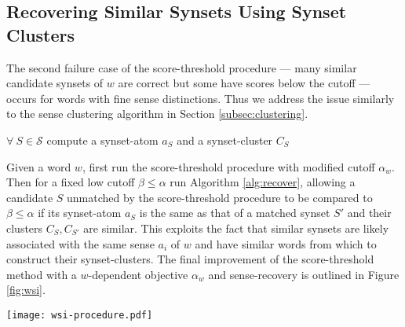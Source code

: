 \documentclass{book}
\begin{document}
\subsection{Recovering Similar Synsets Using Synset Clusters}
\label{subsec:recover}

The second failure case of the score-threshold procedure --- many similar candidate synsets of $w$ are correct but some have scores below the cutoff --- occurs for words with fine sense distinctions.
Thus we address the issue similarly to the sense clustering algorithm in Section \ref{subsec:clustering}.

\begin{algorithm}[H]
\label{alg:recover}
\SetAlgoLined
\SetAlgoNoEnd
{}
$\forall~S\in\mathcal{S}$ compute a synset-atom $a_S$ and a synset-cluster $C_S$\\
\caption{Synset Recovery}
\end{algorithm}

Given a word $w$, first run the score-threshold procedure with modified cutoff $\alpha_w$.
Then for a fixed low cutoff $\beta\le\alpha$ run Algorithm \ref{alg:recover}, allowing a candidate $S$ unmatched by the score-threshold procedure to be compared to $\beta\le\alpha$ if its synset-atom $a_S$ is the same as that of a matched synset $S'$ and their clusters $C_S,C_{S'}$ are similar.
This exploits the fact that similar synsets are likely associated with the same sense $a_i$ of $w$ and have similar words from which to construct their synset-clusters.
The final improvement of the score-threshold method with a $w$-dependent objective $\alpha_w$ and sense-recovery is outlined in Figure \ref{fig:wsi}.

\begin{figure*}[ht!]
\centering
\texttt{[image: wsi-procedure.pdf]}
\caption{
Score-threshold and sense-recovery procedures for French word $w=$ {\em dalle} (flagstone, slab).
Candidates are matched to $w$ if their score clears a cutoff $\alpha_w$.
If an unmatched synset shares a sense $a_i$ with a matched one, it is compared to a lower cutoff $\beta$ (sense-recovery).
}
\label{fig:wsi}
\end{figure*}
\end{document}
